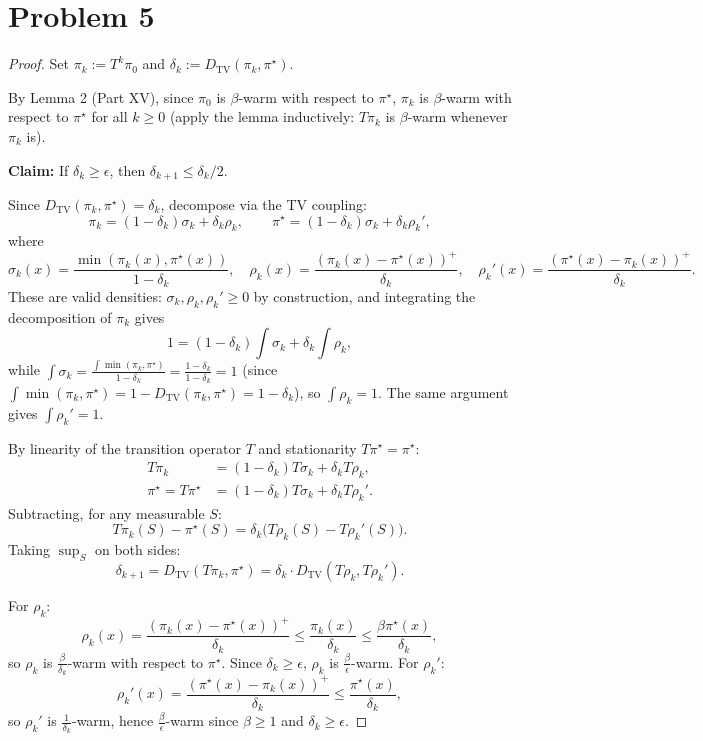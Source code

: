 \documentclass[12pt]{article}
\begin{document}
\section*{Problem 5}
\begin{proof}
Set $\pi_k := T^k \pi_0$ and $\delta_k := D_{\mathrm{TV}}(\pi_k, \pi^\star)$.

By Lemma 2 (Part XV), since $\pi_0$ is $\beta$-warm with respect to $\pi^\star$, $\pi_k$ is $\beta$-warm with respect to $\pi^\star$ for all $k \ge 0$ (apply the lemma inductively: $T\pi_k$ is $\beta$-warm whenever $\pi_k$ is).

\textbf{Claim:} If $\delta_k \ge \epsilon$, then $\delta_{k+1} \le \delta_k / 2$.

Since $D_{\mathrm{TV}}(\pi_k, \pi^\star) = \delta_k$, decompose via the TV coupling:
\[
\pi_k = (1 - \delta_k)\sigma_k + \delta_k \rho_k, \qquad \pi^\star = (1 - \delta_k)\sigma_k + \delta_k \rho_k',
\]
where
\[
\sigma_k(x) = \frac{\min(\pi_k(x), \pi^\star(x))}{1 - \delta_k}, \quad \rho_k(x) = \frac{(\pi_k(x) - \pi^\star(x))^+}{\delta_k}, \quad \rho_k'(x) = \frac{(\pi^\star(x) - \pi_k(x))^+}{\delta_k}.
\]
These are valid densities: $\sigma_k, \rho_k, \rho_k' \ge 0$ by construction, and integrating the decomposition of $\pi_k$ gives
\[
1 = (1 - \delta_k)\int \sigma_k + \delta_k \int \rho_k,
\]
while $\int \sigma_k = \frac{\int \min(\pi_k, \pi^\star)}{1 - \delta_k} = \frac{1 - \delta_k}{1 - \delta_k} = 1$ (since $\int \min(\pi_k, \pi^\star) = 1 - D_{\mathrm{TV}}(\pi_k, \pi^\star) = 1 - \delta_k$), so $\int \rho_k = 1$. The same argument gives $\int \rho_k' = 1$.

By linearity of the transition operator $T$ and stationarity $T\pi^\star = \pi^\star$:
\begin{align*}
T\pi_k &= (1 - \delta_k) T\sigma_k + \delta_k T\rho_k, \\
\pi^\star = T\pi^\star &= (1 - \delta_k) T\sigma_k + \delta_k T\rho_k'.
\end{align*}
Subtracting, for any measurable $S$:
\[
T\pi_k(S) - \pi^\star(S) = \delta_k \bigl(T\rho_k(S) - T\rho_k'(S)\bigr).
\]
Taking $\sup_S$ on both sides:
\[
\delta_{k+1} = D_{\mathrm{TV}}(T\pi_k, \pi^\star) = \delta_k \cdot D_{\mathrm{TV}}(T\rho_k, T\rho_k').
\]

For $\rho_k$:
\[
\rho_k(x) = \frac{(\pi_k(x) - \pi^\star(x))^+}{\delta_k} \le \frac{\pi_k(x)}{\delta_k} \le \frac{\beta \pi^\star(x)}{\delta_k},
\]
so $\rho_k$ is $\frac{\beta}{\delta_k}$-warm with respect to $\pi^\star$. Since $\delta_k \ge \epsilon$, $\rho_k$ is $\frac{\beta}{\epsilon}$-warm. For $\rho_k'$:
\[
\rho_k'(x) = \frac{(\pi^\star(x) - \pi_k(x))^+}{\delta_k} \le \frac{\pi^\star(x)}{\delta_k},
\]
so $\rho_k'$ is $\frac{1}{\delta_k}$-warm, hence $\frac{\beta}{\epsilon}$-warm since $\beta \ge 1$ and $\delta_k \ge \epsilon$.


\end{proof}
\end{document}
